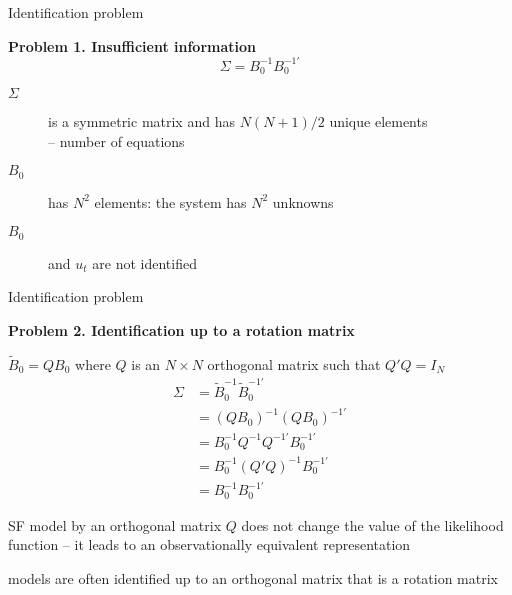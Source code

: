 \documentclass[notes,blackandwhite,mathsans,usenames,dvipsnames]{beamer}
\begin{document}
\begin{frame}{Identification problem}

\textbf{Problem 1. Insufficient information}
$$\Sigma = B_0^{-1}B_0^{-1\prime}$$

\begin{description}
\item[$\Sigma$] {\color{mcxs2}is a symmetric matrix and has} $N(N+1)/2$ {\color{mcxs2}unique elements\\ -- number of equations}

\bigskip\item[$B_0$] {\color{mcxs2}has} $N^2$ {\color{mcxs2}elements: the system has} $N^2$ {\color{mcxs2}unknowns}

\bigskip\item[$B_0$] {\color{mcxs2}and} $u_t$ {\color{mcxs2}are} {\color{purple}not identified} 
\end{description}

\end{frame}




\begin{frame}{Identification problem}

\textbf{Problem 2. Identification up to a rotation matrix}

 $\tilde{B}_0= QB_0$ {\color{mcxs2}where} $Q$ {\color{mcxs2}is an} $N\times N$ {\color{mcxs2}orthogonal matrix such that} $Q'Q=I_N$ 
\begin{align*}
\Sigma &= \tilde{B}_0^{-1}\tilde{B}_0^{-1\prime}\\
&= (QB_0)^{-1}(QB_0)^{-1\prime}\\
&= B_0^{-1}Q^{-1}Q^{-1\prime}B_0^{-1\prime}\\
&= B_0^{-1}(Q'Q)^{-1}B_0^{-1\prime}\\
&= B_0^{-1}B_0^{-1\prime}
\end{align*}

 {\color{purple}SF} {\color{mcxs2}model by an orthogonal matrix} $Q$ {\color{mcxs2}does not change the value of the likelihood function -- it leads to an observationally equivalent representation}

 {\color{mcxs2}models are often identified up to an orthogonal matrix that is a rotation matrix}

\end{frame}
\end{document}
